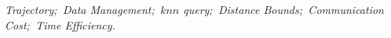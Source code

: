 \begin{itemize}
%

\end{itemize}

\hspace{-0.5cm}
{} \textit{Trajectory;\, Data Management;\, $knn$ query;\, Distance Bounds;\, Communication Cost;\, Time Efficiency.
}
































